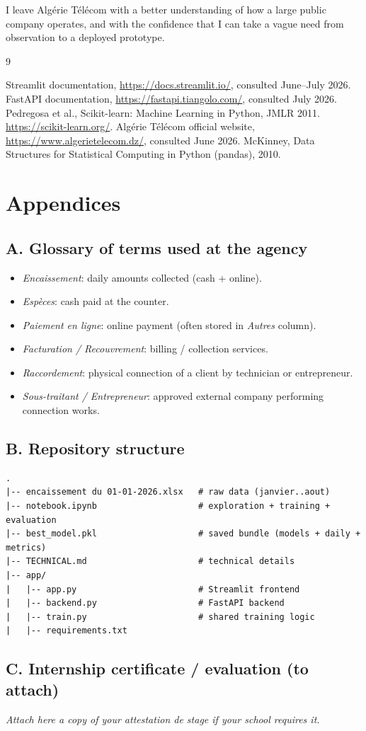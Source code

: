 \documentclass[12pt,a4paper]{report}
\begin{document}
I leave Algérie Télécom with a better understanding of how a large public company operates, and with the confidence that I can take a vague need from observation to a deployed prototype.

\begin{thebibliography}{9}

 Streamlit documentation, \url{https://docs.streamlit.io/}, consulted June--July 2026.
 FastAPI documentation, \url{https://fastapi.tiangolo.com/}, consulted July 2026.
 Pedregosa et al., Scikit-learn: Machine Learning in Python, JMLR 2011. \url{https://scikit-learn.org/}.
 Algérie Télécom official website, \url{https://www.algerietelecom.dz/}, consulted June 2026.
 McKinney, Data Structures for Statistical Computing in Python (pandas), 2010.

\end{thebibliography}

\appendix
\chapter{Appendices}

\section*{A. Glossary of terms used at the agency}
\begin{itemize}
\item \textit{Encaissement}: daily amounts collected (cash + online).
\item \textit{Espèces}: cash paid at the counter.
\item \textit{Paiement en ligne}: online payment (often stored in \textit{Autres} column).
\item \textit{Facturation / Recouvrement}: billing / collection services.
\item \textit{Raccordement}: physical connection of a client by technician or entrepreneur.
\item \textit{Sous-traitant / Entrepreneur}: approved external company performing connection works.
\end{itemize}

\section*{B. Repository structure}
\begin{lstlisting}[caption=Project files]
.
|-- encaissement du 01-01-2026.xlsx   # raw data (janvier..aout)
|-- notebook.ipynb                    # exploration + training + evaluation
|-- best_model.pkl                    # saved bundle (models + daily + metrics)
|-- TECHNICAL.md                      # technical details
|-- app/
|   |-- app.py                        # Streamlit frontend
|   |-- backend.py                    # FastAPI backend
|   |-- train.py                      # shared training logic
|   |-- requirements.txt
\end{lstlisting}

\section*{C. Internship certificate / evaluation (to attach)}
\textit{Attach here a copy of your attestation de stage if your school requires it.}
\end{document}
